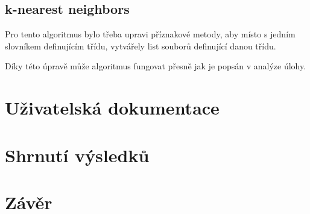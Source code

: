 \documentclass[12pt]{article}
\begin{document}
\subsection{k-nearest neighbors}
Pro tento algoritmus bylo třeba upravi příznakové metody, 
aby místo s jedním slovníkem definujícím třídu, vytvářely
list souborů definující danou třídu.

Díky této úpravě může algoritmus fungovat přesně jak je 
popsán v analýze úlohy.
%
%
\section{Uživatelská dokumentace}
%
%
\section{Shrnutí výsledků}
%
%
\section{Závěr}
%
\end{document}
